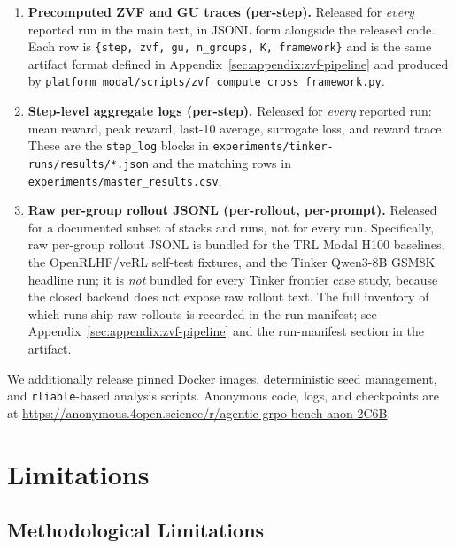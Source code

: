 \documentclass{article}
\begin{document}
\begin{enumerate}
  \item \textbf{Precomputed ZVF and GU traces (per-step).} Released for
        \emph{every} reported run in the main text, in JSONL form alongside
        the released code. Each row is
        \texttt{\{step, zvf, gu, n\_groups, K, framework\}} and is the
        same artifact format defined in Appendix~\ref{sec:appendix:zvf-pipeline}
        and produced by \texttt{platform\_modal/scripts/zvf\_compute\_cross\_framework.py}.
  \item \textbf{Step-level aggregate logs (per-step).} Released for
        \emph{every} reported run: mean reward, peak reward, last-10
        average, surrogate loss, and reward trace. These are the
        \texttt{step\_log} blocks in
        \texttt{experiments/tinker-runs/results/*.json} and the matching
        rows in \texttt{experiments/master\_results.csv}.
  \item \textbf{Raw per-group rollout JSONL (per-rollout, per-prompt).}
        Released for a documented subset of stacks and runs, not for every
        run. Specifically, raw per-group rollout JSONL is bundled for the
        TRL Modal H100 baselines, the OpenRLHF/veRL self-test fixtures,
        and the Tinker Qwen3-8B GSM8K headline run; it is \emph{not}
        bundled for every Tinker frontier case study, because the closed
        backend does not expose raw rollout text. The full inventory of
        which runs ship raw rollouts is recorded in the run manifest;
        see Appendix~\ref{sec:appendix:zvf-pipeline} and the run-manifest
        section in the artifact.
\end{enumerate}

We additionally release pinned Docker images, deterministic seed management,
and \texttt{rliable}-based analysis scripts. Anonymous code, logs, and
checkpoints are at
\url{https://anonymous.4open.science/r/agentic-grpo-bench-anon-2C6B}.

\section{Limitations}
\label{sec:appendix:limitations}
\label{sec:limitations}

\subsection{Methodological Limitations}
\label{sec:method_limits}
\end{document}
